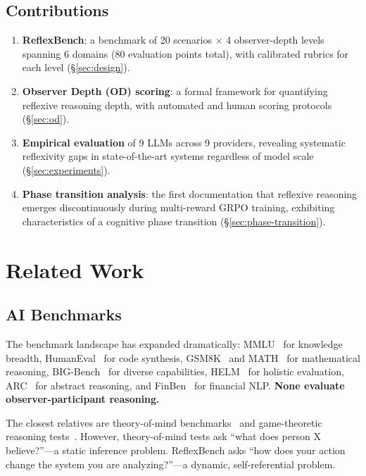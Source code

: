 \documentclass{article}
\begin{document}
\subsection{Contributions}

\begin{enumerate}[leftmargin=*]
\item \textbf{ReflexBench}: a benchmark of 20 scenarios $\times$ 4 observer-depth levels spanning 6 domains (80 evaluation points total), with calibrated rubrics for each level (\S\ref{sec:design}).
\item \textbf{Observer Depth (OD) scoring}: a formal framework for quantifying reflexive reasoning depth, with automated and human scoring protocols (\S\ref{sec:od}).
\item \textbf{Empirical evaluation} of 9 LLMs across 9 providers, revealing systematic reflexivity gaps in state-of-the-art systems regardless of model scale (\S\ref{sec:experiments}).
\item \textbf{Phase transition analysis}: the first documentation that reflexive reasoning emerges discontinuously during multi-reward GRPO training, exhibiting characteristics of a cognitive phase transition (\S\ref{sec:phase-transition}).
\end{enumerate}

\section{Related Work}
\label{sec:related}

\subsection{AI Benchmarks}
The benchmark landscape has expanded dramatically: MMLU~\citep{hendrycks2021} for knowledge breadth, HumanEval~\citep{chen2021} for code synthesis, GSM8K~\citep{cobbe2021} and MATH~\citep{hendrycks2021math} for mathematical reasoning, BIG-Bench~\citep{srivastava2023} for diverse capabilities, HELM~\citep{liang2023} for holistic evaluation, ARC~\citep{chollet2019} for abstract reasoning, and FinBen~\citep{xie2024} for financial NLP. \textbf{None evaluate observer-participant reasoning.}

The closest relatives are theory-of-mind benchmarks~\citep{sap2022,gandhi2024} and game-theoretic reasoning tests~\citep{akata2023}. However, theory-of-mind tests ask ``what does person X believe?''---a static inference problem. ReflexBench asks ``how does your action change the system you are analyzing?''---a dynamic, self-referential problem.
\end{document}
